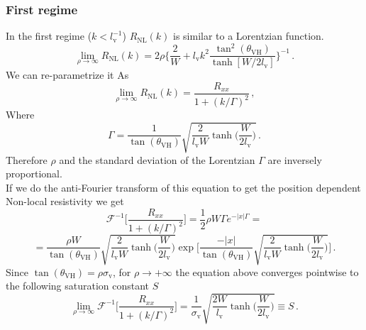 \subsubsection*{First regime}
In the first regime ($k< l_{\textrm{v}}^{-1}$) $R_{\textrm{NL}}(k)$ is similar to a Lorentzian function.
\begin{equation}
    \lim_{\rho\to\infty} R_{\textrm{NL}}(k)=2\rho
    \bigg\{
        \frac 2W+ l_{\textrm{v}}k^2\frac{\tan^2(\theta_{\textrm{VH}})}{\tanh[W/2l_{\textrm{v}}]}  
    \bigg\}^{-1}\,.
\end{equation}
We can re-parametrize it As
\begin{equation}
    \lim_{\rho\to\infty} R_{\textrm{NL}}(k)=\frac{R_{xx}}{1+(k/\Gamma)^2}\,,
\end{equation}
Where 
\[
    \Gamma=\frac 1 {\tan(\theta_{\textrm{VH}})}\sqrt{\frac 2{l_{\textrm{v}}W} \tanh\bigg(\frac W{2l_{\textrm{v}}}\bigg)}\,.
\]
Therefore $\rho$ and the standard deviation of the Lorentzian $\Gamma$ are inversely proportional.\\
If we do the anti-Fourier transform of this equation to get the position dependent Non-local resistivity we get 
\[
    \mathcal F^{-1}\bigg[\frac{R_{xx}}{1+(k/\Gamma)^2} \bigg]=\frac 12\rho W\Gamma {e^{-|x|\Gamma}}=
\]
\begin{equation}
    =\frac {\rho W}{\tan(\theta_{\textrm{VH}})}\sqrt{\frac 2{l_{\textrm{v}} W}\tanh\bigg(\frac W{2l_{\textrm{v}}}\bigg)}
    \exp\Bigg[
        \frac{-|x|}{\tan(\theta_{\textrm{VH}})}\sqrt{\frac 2{l_{\textrm{v}} W}\tanh\bigg(\frac W{2l_{\textrm{v}}}\bigg)}
    \Bigg]\,.
\end{equation}
Since $\tan(\theta_{\textrm{VH}})=\rho \sigma_{\textrm{v}}$, for $\rho\to +\infty$ the equation above converges pointwise to the following saturation constant $S$
\begin{equation}
    \lim_{\rho\to\infty}\mathcal F^{-1}\bigg[\frac{R_{xx}}{1+(k/\Gamma)^2} \bigg]=\frac 1{\sigma_{\textrm{v}}}\sqrt{\frac {2W}{l_{\textrm{v}}}\tanh\bigg(\frac W{2l_{\textrm{v}}} \bigg)}\equiv S\,.
\end{equation}

